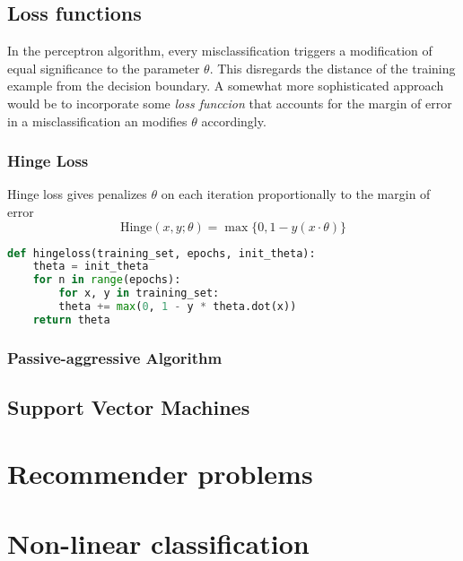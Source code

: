 \documentclass{article}
\theoremstyle{definition}
\theoremstyle{remark}
\begin{document}
\subsection{Loss functions}
In the perceptron algorithm, every misclassification triggers a modification of equal significance to the parameter $\theta$. 
This disregards the distance of the training example from the decision boundary.
A somewhat more sophisticated approach would be to incorporate some \textit{loss funccion} that accounts for the margin of error in a misclassification an modifies $\theta$ accordingly.

\subsubsection{Hinge Loss}
Hinge loss gives penalizes $\theta$ on each iteration proportionally to the margin of error
\begin{equation}
  \text{Hinge}(x, y; \theta) = \max\{0, 1 - y(x\cdot\theta)\}
  \label{eqn:hingeloss}
\end{equation}
\begin{lstlisting}[language=Python]
def hingeloss(training_set, epochs, init_theta):
    theta = init_theta
    for n in range(epochs):
        for x, y in training_set:
	    theta += max(0, 1 - y * theta.dot(x))
    return theta
\end{lstlisting}
\subsubsection{Passive-aggressive Algorithm}
\subsection{Support Vector Machines}

\section{Recommender problems}

\section{Non-linear classification}
\end{document}
